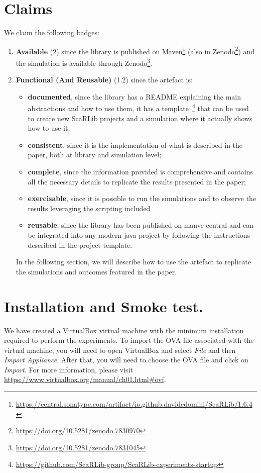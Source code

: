 \documentclass[runningheads]{llncs}
\begin{document}
\section{Claims}
We claim the following badges:
\begin{enumerate}
  \item[C.1] \textbf{Available} (2) since the library is published on Maven\footnote{\url{https://central.sonatype.com/artifact/io.github.davidedomini/ScaRLib/1.6.4}} (also in Zenodo\footnote{\url{https://doi.org/10.5281/zenodo.7830970}}) and the simulation is available through Zenodo\footnote{\url{https://doi.org/10.5281/zenodo.7831045}}. 
  \item[C.2] \textbf{Functional (And Reusable)} (1.2)  %
  since the artefact is:
  \begin{itemize}
  \item \textbf{documented}, since the library has a README explaining the main abstractions and how to use them, it has a template~\footnote{\url{https://github.com/ScaRLib-group/ScaRLib-experiments-startup}} that can be used to create new ScaRLib projects and a simulation where it actually shows how to use it;
  \item \textbf{consistent}, since it is the implementation of what is described in the paper, both at library and simulation level;
  \item \textbf{complete}, since the information provided is comprehensive and contains all the necessary details to replicate the results presented in the paper;
  \item \textbf{exercisable}, since it is possible to run the simulations and to observe the results  leveraging the scripting included
  \item \textbf{reusable}, since the library has been published on manve central and can be integrated into any modern java project by following the instructions described in the project template.
\end{itemize}
In the following section, we will describe how to use the artefact to replicate the simulations and outcomes featured in the paper.
\end{enumerate}
\section{Installation and Smoke test.} 
We have created a VirtualBox virtual machine with the minimum installation required to perform the experiments. To import the OVA file associated with the virtual machine, you will need to open VirtualBox and select \textit{File} and then \textit{Import Appliance}. After that, you will need to choose the OVA file and click on \textit{Import}. For more information, please visit \url{https://www.virtualbox.org/manual/ch01.html#ovf}.
\end{document}
